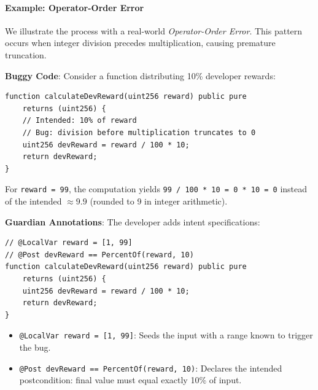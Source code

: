 \documentclass[pdflatex,sn-basic]{sn-jnl}%
\theoremstyle{thmstyleone}%
\theoremstyle{thmstyletwo}%
\theoremstyle{thmstylethree}%
\begin{document}
\paragraph{Example: Operator-Order Error}
We illustrate the process with a real-world \textit{Operator-Order Error}. This pattern occurs when integer division precedes multiplication, causing premature truncation.

\textbf{Buggy Code}: Consider a function distributing 10\% developer rewards:

\begin{lstlisting}[language=Solidity]
function calculateDevReward(uint256 reward) public pure
    returns (uint256) {
    // Intended: 10% of reward
    // Bug: division before multiplication truncates to 0
    uint256 devReward = reward / 100 * 10;
    return devReward;
}
\end{lstlisting}

For \texttt{reward = 99}, the computation yields \texttt{99 / 100 * 10 = 0 * 10 = 0} instead of the intended $\approx 9.9$ (rounded to 9 in integer arithmetic).

\textbf{Guardian Annotations}: The developer adds intent specifications:

\begin{lstlisting}[language=Solidity]
// @LocalVar reward = [1, 99]
// @Post devReward == PercentOf(reward, 10)
function calculateDevReward(uint256 reward) public pure
    returns (uint256) {
    uint256 devReward = reward / 100 * 10;
    return devReward;
}
\end{lstlisting}

\begin{itemize}
    \item \texttt{@LocalVar reward = [1, 99]}: Seeds the input with a range known to trigger the bug.
    \item \texttt{@Post devReward == PercentOf(reward, 10)}: Declares the intended postcondition: final value must equal exactly 10\% of input.
\end{itemize}
\end{document}
